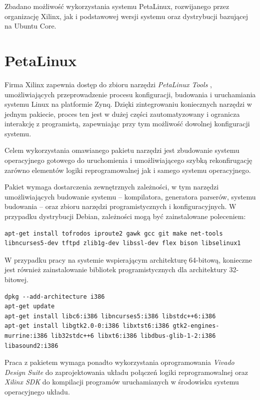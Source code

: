 Zbadano możliwość wykorzystania systemu PetaLinux, rozwijanego przez organizację Xilinx, jak i podstawowej wersji systemu oraz dystrybucji bazującej na Ubuntu Core.

\section{PetaLinux}
Firma Xilinx zapewnia dostęp do zbioru narzędzi \emph{PetaLinux Tools} \cite{petalinux-tools}, umożliwiających przeprowadzenie procesu konfiguracji, budowania i uruchamiania systemu Linux na platformie Zynq. Dzięki zintegrowaniu koniecznych narzędzi w jednym pakiecie, proces ten jest w dużej części zautomatyzowany i ogranicza interakcję z programistą, zapewniając przy tym możliwość dowolnej konfiguracji systemu.

Celem wykorzystania omawianego pakietu narzędzi jest zbudowanie systemu operacyjnego gotowego do uruchomienia i umożliwiającego szybką rekonfirugację zarówno elementów logiki reprogramowalnej jak i samego systemu operacyjnego.

Pakiet wymaga dostarczenia zewnętrznych zależności, w tym narzędzi umożliwiających budowanie systemu -- kompilatora, generatora parserów, systemu budowania -- oraz zbioru narzędzi programistycznych i konfiguracyjnych.
W przypadku dystrybucji Debian, zależności mogą być zainstalowane poleceniem:

\begin{lstlisting}[breaklines=true]
apt-get install tofrodos iproute2 gawk gcc git make net-tools libncurses5-dev tftpd zlib1g-dev libssl-dev flex bison libselinux1
\end{lstlisting}

W przypadku pracy na systemie wspierającym architekturę 64-bitową, konieczne jest również zainstalowanie bibliotek programistycznych dla architektury 32-bitowej.

\begin{lstlisting}[breaklines=true]
dpkg --add-architecture i386
apt-get update
apt-get install libc6:i386 libncurses5:i386 libstdc++6:i386
apt-get install libgtk2.0-0:i386 libxtst6:i386 gtk2-engines-murrine:i386 lib32stdc++6 libxt6:i386 libdbus-glib-1-2:i386 libasound2:i386
\end{lstlisting}

Praca z pakietem wymaga ponadto wykorzystania oprogramowania \emph{Vivado Design Suite} \cite{vivado-home} do zaprojektowania układu połączeń logiki reprogramowalnej oraz \emph{Xilinx SDK} \cite{xsdk-home} do kompilacji programów uruchamianych w środowisku systemu operacyjnego układu.

